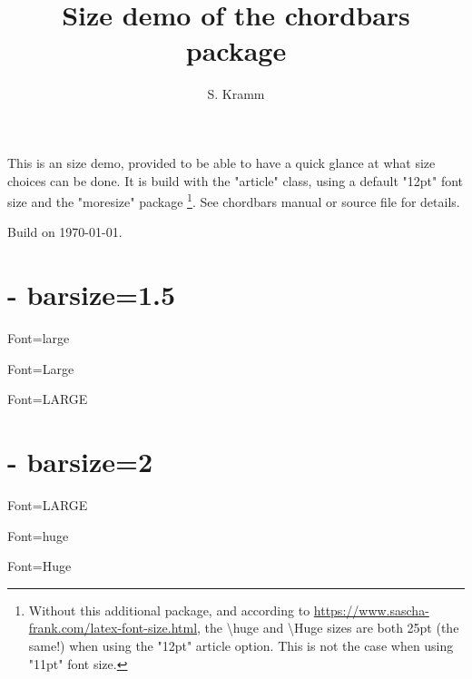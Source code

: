 \documentclass[12pt]{article}
\title{Size demo of the chordbars package}
\author{S. Kramm}
\begin{document}
\countbarsNo

\songtitle


This is an size demo, provided to be able to have a quick glance at what size choices can be done.
It is build with the "article" class,
using a default "12pt" font size and the "moresize" package
\footnote{Without this additional package, and according to \url{https://www.sascha-frank.com/latex-font-size.html},
the \textbackslash huge and \textbackslash Huge sizes are both 25pt (the same!) when using the "12pt" article option.
This is not the case when using "11pt" font size.}.
See chordbars manual or source file for details.

Build on \today.

\section{- barsize=1.5}
\def\barsize{1.5}%

\def\chordFontSize{\large\bfseries}
\begin{chordbar}{4}{Font=large}
\end{chordbar}


\def\chordFontSize{\Large\bfseries}
\begin{chordbar}{4}{Font=Large}
\end{chordbar}

\def\chordFontSize{\LARGE\bfseries}
\begin{chordbar}{4}{Font=LARGE}
\end{chordbar}

\section{- barsize=2}
\def\barsize{2}%

\def\chordFontSize{\LARGE\bfseries}
\begin{chordbar}{4}{Font=LARGE}
\end{chordbar}

\def\chordFontSize{\huge\bfseries}
\begin{chordbar}{4}{Font=huge}
\end{chordbar}


\def\chordFontSize{\Huge\bfseries}
\begin{chordbar}{4}{Font=Huge}
\end{chordbar}
\end{document}
